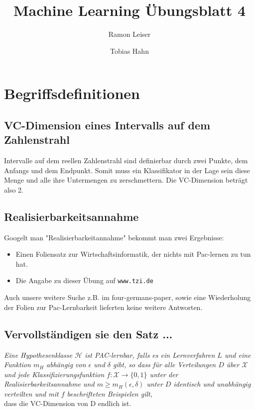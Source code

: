 \documentclass[a4paper]{article}
\title{Machine Learning Übungsblatt 4}
\author{Ramon Leiser\and Tobias Hahn}
\begin{document}
\maketitle
\newpage
 \section{Begriffsdefinitionen}
 
\subsection{VC-Dimension eines Intervalls auf dem Zahlenstrahl}
Intervalle auf dem reellen Zahlenstrahl sind definierbar durch zwei Punkte, dem Anfangs und dem Endpunkt. Somit muss ein Klassifikator in der Lage sein diese Menge und alle ihre Untermengen zu zerschmettern. Die VC-Dimension beträgt also 2.

\subsection{Realisierbarkeitsannahme}
Googelt man "Realisierbarkeitannahme" bekommt man zwei Ergebnisse:
\begin{itemize}
\item Einen Foliensatz zur Wirtschaftsinformatik, der nichts mit Pac-lernen zu tun hat.
\item Die Angabe zu dieser Übung auf \texttt{www.tzi.de}
\end{itemize}
Auch unsere weitere Suche z.B. im four-germans-paper, sowie eine Wiederholung der Folien zur Pac-Lernbarkeit lieferten keine weitere Antworten.\\


\subsection{Vervollständigen sie den Satz ...}
\textit{Eine Hypothesenklasse $\mathcal{H}$  ist PAC-lernbar, falls es ein Lernverfahren $L$ und eine Funktion $m_H$ abhängig von $\epsilon$ und $\delta$ gibt, so dass für alle Verteilungen $D$ über $\mathcal{X}$ und jede Klassifizierungsfunktion $f : \mathcal{X} \rightarrow \{0, 1\}$ unter der Realisierbarkeitsannahme und $ m \geq m_H(\epsilon, \delta) $ unter $D$ identisch und unabhängig verteilten und mit $f$ beschrifteten Beispielen gilt, }\\
dass die VC-Dimension von D endlich ist.
\end{document}
